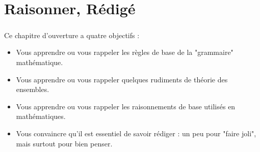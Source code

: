\chapter{Raisonner, Rédigé}

\paragraph{} Ce chapitre d'ouverture a quatre objectifs :
\begin{itemize}
	\item Vous apprendre ou vous rappeler les règles de base de la "grammaire" mathématique.
	\item Vous apprendre ou vous rappeler quelques rudiments de théorie des ensembles.
	\item Vous apprendre ou vous rappeler les raisonnements de base utilisés en mathématiques.
	\item Vous convaincre qu'il est essentiel de savoir rédiger : un peu pour "faire joli", mais surtout pour bien penser.
\end{itemize}

